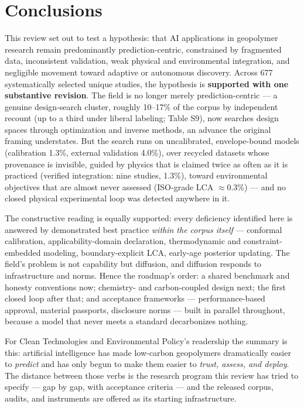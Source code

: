 \documentclass[pdflatex,sn-basic]{sn-jnl}
\begin{document}
\section{Conclusions}

This review set out to test a hypothesis: that AI applications in geopolymer research remain predominantly prediction-centric, constrained by fragmented data, inconsistent validation, weak physical and environmental integration, and negligible movement toward adaptive or autonomous discovery. Across 677 systematically selected unique studies, the hypothesis is \textbf{supported with one substantive revision}. The field is no longer merely prediction-centric --- a genuine design-search cluster, roughly 10--17\% of the corpus by independent recount (up to a third under liberal labeling; Table S9), now searches design spaces through optimization and inverse methods, an advance the original framing understates. But the search runs on uncalibrated, envelope-bound models (calibration 1.3\%, external validation 4.0\%), over recycled datasets whose provenance is invisible, guided by physics that is claimed twice as often as it is practiced (verified integration: nine studies, 1.3\%), toward environmental objectives that are almost never assessed (ISO-grade LCA $\approx$0.3\%) --- and no closed physical experimental loop was detected anywhere in it.

The constructive reading is equally supported: every deficiency identified here is answered by demonstrated best practice \emph{within the corpus itself} --- conformal calibration, applicability-domain declaration, thermodynamic and constraint-embedded modeling, boundary-explicit LCA, early-age posterior updating. The field's problem is not capability but diffusion, and diffusion responds to infrastructure and norms. Hence the roadmap's order: a shared benchmark and honesty conventions now; chemistry- and carbon-coupled design next; the first closed loop after that; and acceptance frameworks --- performance-based approval, material passports, disclosure norms --- built in parallel throughout, because a model that never meets a standard decarbonizes nothing.

For Clean Technologies and Environmental Policy's readership the summary is this: artificial intelligence has made low-carbon geopolymers dramatically easier to \emph{predict} and has only begun to make them easier to \emph{trust, assess, and deploy}. The distance between those verbs is the research program this review has tried to specify --- gap by gap, with acceptance criteria --- and the released corpus, audits, and instruments are offered as its starting infrastructure.
\end{document}

